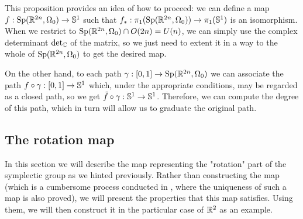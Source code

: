 \begin{rmrk} \label{homotopygroupisomorphism}
This proposition provides an idea of how to proceed: we can define a map $f : \text{Sp}(\mathbb{R}^{2n},\Omega_0) \rightarrow \mathbb{S}^1$ such that $f_{\ast} : \pi_1(\text{Sp}(\mathbb{R}^{2n},\Omega_0)) \rightarrow \pi_1(\mathbb{S}^1)$ is an isomorphism. When we restrict to $\text{Sp}(\mathbb{R}^{2n},\Omega_0) \cap O(2n) = U(n)$, we can simply use the complex determinant $\text{det}_{\mathbb{C}}$ of the matrix, so we just need to extent it in a way to the whole of $\text{Sp}(\mathbb{R}^{2n},\Omega_0)$ to get the desired map.

On the other hand, to each path $\gamma : [0,1] \rightarrow \text{Sp}(\mathbb{R}^{2n},\Omega_0)$ we can associate the path $f \circ \gamma : [0,1] \rightarrow \mathbb{S}^1$ which, under the appropriate conditions, may be regarded as a closed path, so we get $\tilde{f} \circ \gamma : \mathbb{S}^1 \rightarrow \mathbb{S}^1$. Therefore, we can compute the degree of this path, which in turn will allow us to graduate the original path.
\end{rmrk}

\subsection{The rotation map}

In this section we will describe the map representing the "rotation" part of the symplectic group as we hinted previously. Rather than constructing the map (which is a cumbersome process conducted in \cite{gutt2012conley}, where the uniqueness of such a map is also proved), we will present the properties that this map satisfies. Using them, we will then construct it in the particular case of $\mathbb{R}^2$ as an example.

